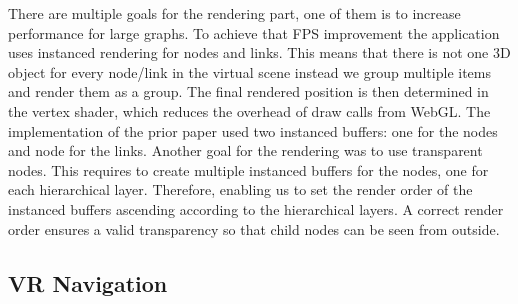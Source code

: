 There are multiple goals for the rendering part, one of them is to increase performance for large graphs. 
To achieve that FPS improvement the application uses instanced rendering for nodes and links. This means that there is not one 3D object for every node/link in the virtual scene instead we group multiple items and render them as a group. The final rendered position is then determined in the vertex shader, which reduces the overhead of draw calls from WebGL.
The implementation of the prior paper used two instanced buffers: one for the nodes and node for the links. 
Another goal for the rendering was to use transparent nodes. This requires to create multiple instanced buffers for the nodes, one for each hierarchical layer. 
Therefore, enabling us to set the render order of the instanced buffers ascending according to the hierarchical layers. A correct render order ensures  a valid transparency so that child nodes can be seen from outside.

\subsection{VR Navigation}
\label{sec:vrInteractions}

